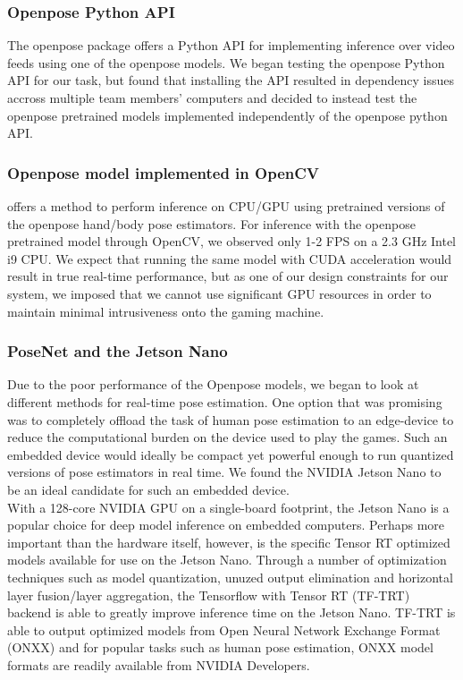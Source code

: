 \documentclass[10pt,twocolumn,letterpaper]{article}
\begin{document}
\subsubsection{Openpose Python API}
The openpose package offers a Python API for implementing inference over video feeds using one 
of the openpose models. We began testing the openpose Python API for our task, but found that 
installing the API resulted in dependency issues accross multiple team members' computers and 
decided to instead test the openpose pretrained models implemented independently of the openpose 
python API.

\subsubsection{Openpose model implemented in OpenCV}
\cite{opencvPose} offers a method to perform inference on CPU/GPU using pretrained versions of the 
openpose hand/body pose estimators. For inference with the openpose pretrained model through 
OpenCV, we observed only 1-2 FPS on a 2.3 GHz Intel i9 CPU. We expect that running the same model 
with CUDA acceleration would result in true real-time performance, but as one of our design 
constraints for our system, we imposed that we cannot use significant GPU resources in order to 
maintain minimal intrusiveness onto the gaming machine.

\subsubsection{PoseNet and the Jetson Nano}
Due to the poor performance of the Openpose models, we began to look at different methods for 
real-time pose estimation. One option that was promising was to completely offload the task of 
human pose estimation to an edge-device to reduce the computational burden on the device used 
to play the games. Such an embedded device would ideally be compact yet powerful enough to run 
quantized versions of pose estimators in real time. We found the NVIDIA Jetson Nano to be an 
ideal candidate for such an embedded device.\\

With a 128-core NVIDIA GPU on a single-board footprint, the Jetson Nano is a popular 
choice for deep model inference on embedded computers. Perhaps more important than the hardware 
itself, however, is the specific Tensor RT optimized models available for use on the Jetson Nano. 
Through a number of optimization techniques such as model quantization, unuzed output elimination 
and horizontal layer fusion/layer aggregation, the Tensorflow with Tensor RT (TF-TRT) backend is 
able to greatly improve inference time on the Jetson Nano. TF-TRT is able to output optimized 
models from Open Neural Network Exchange Format (ONXX) and for popular tasks such as human pose 
estimation, ONXX model formats are readily available from NVIDIA Developers.\\
\end{document}
